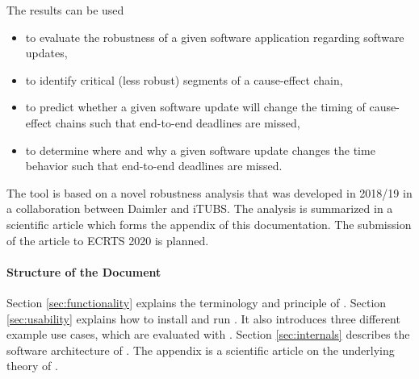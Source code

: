 \noindent
The results can be used
\begin{itemize}
	\item to evaluate the robustness of a given software application regarding software updates, 
	\item to identify critical (less robust) segments of a cause-effect chain,
	\item to predict whether a given software update will change the timing of cause-effect chains such that end-to-end deadlines are missed,
	\item to determine where and why a given software update changes the time behavior such that end-to-end deadlines are missed.
\end{itemize}
\bigskip

\noindent
The tool \Tool is based on a novel robustness analysis that was developed in 2018/19 in a collaboration between Daimler and iTUBS.
The analysis is summarized in a scientific article which forms the appendix of this documentation.
The submission of the article to ECRTS 2020 is planned.


\paragraph{Structure of the Document}
Section \ref{sec:functionality} explains the terminology and principle of \Tool. 
Section \ref{sec:usability} explains how to install and run \Tool. It also introduces three different example use cases, which are evaluated with \Tool. 
Section \ref{sec:internals} describes the software architecture of \Tool.  
The appendix is a scientific article on the underlying theory of \Tool.



